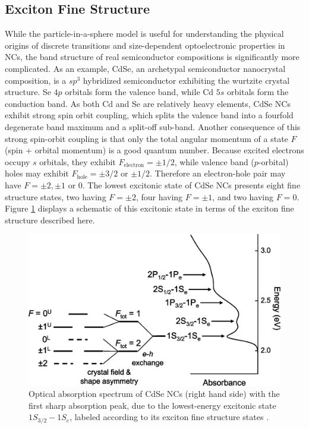 \subsection{Exciton Fine Structure}
While the particle-in-a-sphere model is useful for understanding the physical origins of discrete transitions and size-dependent optoelectronic properties in NCs, the band structure of real semiconductor compositions is significantly more complicated. As an example, CdSe, an archetypal semiconductor nanocrystal composition, is a $sp^3$ hybridized semiconductor exhibiting the wurtzite crystal structure. Se $4p$ orbitals form the valence band, while Cd $5s$ orbitals form the conduction band. As both Cd and Se are relatively heavy elements, CdSe NCs exhibit strong spin orbit coupling, which splits the valence band into a fourfold degenerate band maximum and a split-off sub-band. Another consequence of this strong spin-orbit coupling is that only the total angular momentum of a state $F$ (spin + orbital momentum) is a good quantum number. Because excited electrons occupy $s$ orbitals, they exhibit $F_{\mathrm{electron}} = \pm1/2$, while valence band ($p$-orbital) holes may exhibit $F_{\mathrm{hole}} = \pm3/2$ or $\pm1/2$. Therefore an electron-hole pair may have $F = \pm2, \pm1$ or 0. The lowest excitonic state of CdSe NCs presents eight fine structure states, two having $F = \pm2$, four having $F= \pm1$, and two having $F = 0$. Figure \ref{f:efs1} displays a schematic of this excitonic state in terms of the exciton fine structure described here. \par

\begin{figure}
\begin{center}
\includegraphics[width=\textwidth]{./Chapter1/efs_scholes.jpeg}
\caption[Exciton fine structure of CdSe nanocrystals]{Optical absorption spectrum of CdSe NCs (right hand side) with the first sharp absorption peak, due to the lowest-energy excitonic state $1S_{3/2}-1S_e$, labeled according to its exciton fine structure states \cite{kim2009exciton}.}
\label{f:efs1}
\end{center}
\end{figure}

